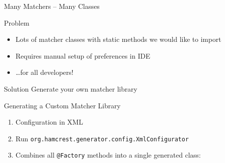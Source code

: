 \begin{frame}{Many Matchers -- Many Classes}
	\begin{block}{Problem}
		\begin{itemize}
			\item Lots of matcher classes with static methods we would like to import
			\item Requires manual setup of preferences in IDE
			\item \dots for all developers!
		\end{itemize}
	\end{block}
	\begin{block}{Solution}
		Generate your own matcher library
	\end{block}
\end{frame}

\begin{frame}[fragile]{Generating a Custom Matcher Library}
	\begin{enumerate}
		\item Configuration in XML
			
		\item Run \texttt{org.hamcrest.generator.config.XmlConfigurator}
		\item Combines all \texttt{@Factory} methods into a single generated class:
	\end{enumerate}
\end{frame}

